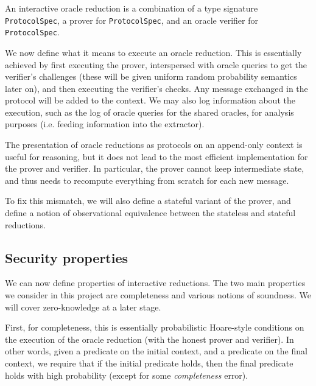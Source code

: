 \begin{definition}
    \label{def:interactive_oracle_reduction}
    An interactive oracle reduction is a combination of a type signature \verb|ProtocolSpec|, a prover for \verb|ProtocolSpec|, and an oracle verifier for \verb|ProtocolSpec|.
\end{definition}

We now define what it means to execute an oracle reduction. This is essentially achieved by first
executing the prover, interspersed with oracle queries to get the verifier's challenges (these will
be given uniform random probability semantics later on), and then executing the verifier's checks.
Any message exchanged in the protocol will be added to the context. We may also log information
about the execution, such as the log of oracle queries for the shared oracles, for analysis purposes
(i.e. feeding information into the extractor).

\begin{definition}
    \label{def:oracle_reduction_execution}
\end{definition}

\begin{remark}
    The presentation of oracle reductions as protocols on an append-only context is useful for
    reasoning, but it does not lead to the most efficient implementation for the prover and
    verifier. In particular, the prover cannot keep intermediate state, and thus needs to recompute
    everything from scratch for each new message.

    To fix this mismatch, we will also define a stateful variant of the prover, and define a notion
    of observational equivalence between the stateless and stateful reductions.
\end{remark}

\subsection{Security properties}

We can now define properties of interactive reductions. The two main properties we consider in this
project are completeness and various notions of soundness. We will cover zero-knowledge at a later
stage.

First, for completeness, this is essentially probabilistic Hoare-style conditions on the execution
of the oracle reduction (with the honest prover and verifier). In other words, given a predicate on
the initial context, and a predicate on the final context, we require that if the initial predicate
holds, then the final predicate holds with high probability (except for some \emph{completeness}
error).

